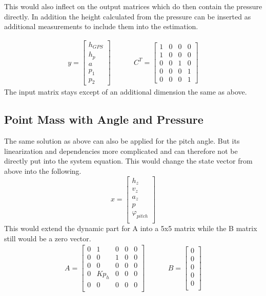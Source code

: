   This would also inflect on the output matrices which do then contain the pressure directly.
  In addition the height calculated from the pressure can be inserted as additional measurements to include them into the estimation.
  
  \begin{align*}
   y = \begin{bmatrix}
        h_{GPS}	\\
        h_{p}	\\
        a	\\
        p_1	\\
        p_2	
       \end{bmatrix}
       & \hspace{1cm}
  C^T = \begin{bmatrix}
       1 & 0 & 0 & 0 \\
       1 & 0 & 0 & 0 \\
       0 & 0 & 1 & 0 \\
       0 & 0 & 0 & 1 \\
       0 & 0 & 0 & 1 
      \end{bmatrix}
  \end{align*}
  The input matrix stays except of an additional dimension the same as above.

  \subsection{Point Mass with Angle and Pressure}
  The same solution as above can also be applied for the pitch angle. 
  But its linearization and dependencies  more complicated and can therefore not be directly put into the system equation.
  This would change the state vector from above into the following.
  $$ x = \begin{bmatrix}
  h_z\\
  v_z\\
  a_z\\
  p\\
  \varphi_{pitch}\\
  \end{bmatrix} $$
  This would extend the dynamic part for A into a 5x5 matrix while the B matrix still would be a zero vector.
  \begin{align*}
  A= \begin{bmatrix}
        0 & 1 & 0 & 0 & 0 \\
        0 & 0 & 1 & 0 & 0 \\
        0 & 0 & 0 & 0 & 0 \\
        0 & Kp_h & 0 & 0 & 0 \\
        0 & 0 & 0 & 0 & 0 \\
        \end{bmatrix}
  & \hspace{1cm}
  B = \begin{bmatrix}
             0 \\
             0 \\
             0 \\
             0 \\
             0 \\
        \end{bmatrix}
  \end{align*}
  
